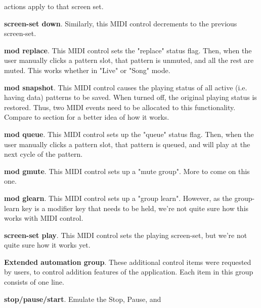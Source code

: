 \begin{enumber}
\begin{enumber}
               actions apply to that screen set.
            \item \textbf{screen-set down}.
               Similarly, this MIDI control decrements to the previous
               screen-set.
            \item \textbf{mod replace}.
               This MIDI control sets the "replace" status flag.
               Then, when the user manually clicks a pattern slot,
               that pattern is unmuted, and all the rest are muted.
               This works whether in "Live" or "Song" mode.
            \item \textbf{mod snapshot}.
               This MIDI control causes the playing status of all active
               (i.e. having data) patterns to be saved.  When turned off, the
               original playing status is restored.  Thus, two MIDI events
               need to be allocated to this functionality. Compare
               to section 
               for a better idea of how it works.
            \item \textbf{mod queue}.
               This MIDI control sets up the "queue" status flag.
               Then, when the user manually clicks a pattern slot,
               that pattern is queued, and will play at the next cycle of the
               pattern.
            \item \textbf{mod gmute}.
               This MIDI control sets up a "mute group".
               More to come on this one.
            \item \textbf{mod glearn}.
               This MIDI control sets up a "group learn".
               However, as the group-learn key is a modifier key that needs to
               be held, we're not quite sure how this works with MIDI control.
            \item \textbf{screen-set play}.
               This MIDI control sets the playing screen-set, 
               but we're not quite sure how it works yet.
         \end{enumber}
      \item \textbf{Extended automation group}.
         These additional control items were requested by users, to control
         addition features of the application.
         Each item in this group consists of one line.
         \begin{enumber}
            \item \textbf{stop/pause/start}.  Emulate the Stop, Pause, and

\end{enumber}
\end{enumber}
